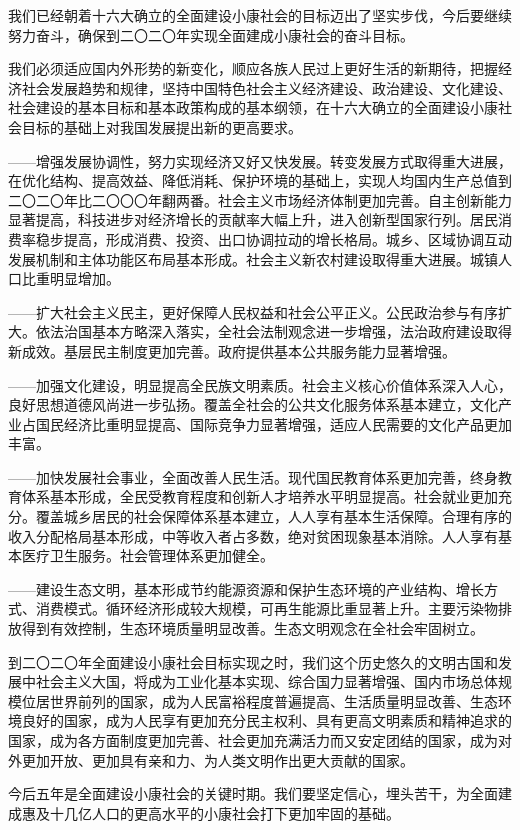 我们已经朝着十六大确立的全面建设小康社会的目标迈出了坚实步伐，今后要继续努力奋斗，确保到二〇二〇年实现全面建成小康社会的奋斗目标。

我们必须适应国内外形势的新变化，顺应各族人民过上更好生活的新期待，把握经济社会发展趋势和规律，坚持中国特色社会主义经济建设、政治建设、文化建设、社会建设的基本目标和基本政策构成的基本纲领，在十六大确立的全面建设小康社会目标的基础上对我国发展提出新的更高要求。

——增强发展协调性，努力实现经济又好又快发展。转变发展方式取得重大进展，在优化结构、提高效益、降低消耗、保护环境的基础上，实现人均国内生产总值到二〇二〇年比二〇〇〇年翻两番。社会主义市场经济体制更加完善。自主创新能力显著提高，科技进步对经济增长的贡献率大幅上升，进入创新型国家行列。居民消费率稳步提高，形成消费、投资、出口协调拉动的增长格局。城乡、区域协调互动发展机制和主体功能区布局基本形成。社会主义新农村建设取得重大进展。城镇人口比重明显增加。

——扩大社会主义民主，更好保障人民权益和社会公平正义。公民政治参与有序扩大。依法治国基本方略深入落实，全社会法制观念进一步增强，法治政府建设取得新成效。基层民主制度更加完善。政府提供基本公共服务能力显著增强。

——加强文化建设，明显提高全民族文明素质。社会主义核心价值体系深入人心，良好思想道德风尚进一步弘扬。覆盖全社会的公共文化服务体系基本建立，文化产业占国民经济比重明显提高、国际竞争力显著增强，适应人民需要的文化产品更加丰富。

——加快发展社会事业，全面改善人民生活。现代国民教育体系更加完善，终身教育体系基本形成，全民受教育程度和创新人才培养水平明显提高。社会就业更加充分。覆盖城乡居民的社会保障体系基本建立，人人享有基本生活保障。合理有序的收入分配格局基本形成，中等收入者占多数，绝对贫困现象基本消除。人人享有基本医疗卫生服务。社会管理体系更加健全。

——建设生态文明，基本形成节约能源资源和保护生态环境的产业结构、增长方式、消费模式。循环经济形成较大规模，可再生能源比重显著上升。主要污染物排放得到有效控制，生态环境质量明显改善。生态文明观念在全社会牢固树立。

到二〇二〇年全面建设小康社会目标实现之时，我们这个历史悠久的文明古国和发展中社会主义大国，将成为工业化基本实现、综合国力显著增强、国内市场总体规模位居世界前列的国家，成为人民富裕程度普遍提高、生活质量明显改善、生态环境良好的国家，成为人民享有更加充分民主权利、具有更高文明素质和精神追求的国家，成为各方面制度更加完善、社会更加充满活力而又安定团结的国家，成为对外更加开放、更加具有亲和力、为人类文明作出更大贡献的国家。

今后五年是全面建设小康社会的关键时期。我们要坚定信心，埋头苦干，为全面建成惠及十几亿人口的更高水平的小康社会打下更加牢固的基础。

